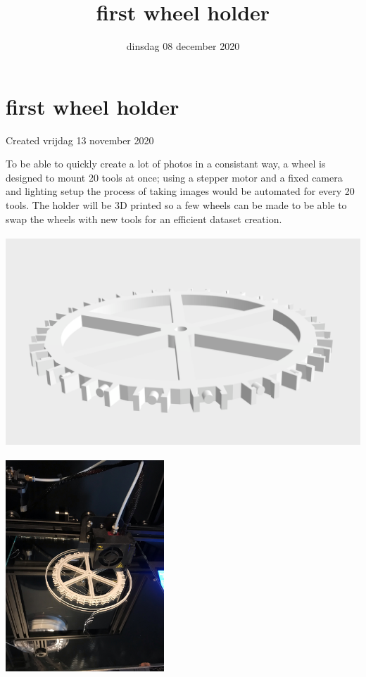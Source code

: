 \documentclass{scrartcl}
\title{first wheel holder}
\date{dinsdag 08 december 2020}
\author{}
\begin{document}
\maketitle

		\section{first wheel holder}

Created vrijdag 13 november 2020



To be able to quickly create a lot of photos in a consistant way, a wheel is designed to mount 20 tools at once; using a stepper motor and a fixed camera and lighting setup the process of taking images would be automated for every 20 tools. The holder will be 3D printed so a few wheels can be made to be able to swap the wheels with new tools for an efficient dataset creation.



\includegraphics[height=3.125000in, keepaspectratio=true]{./first_wheel_holder/radhouder.png}



\includegraphics[height=3.125000in, keepaspectratio=true]{./first_wheel_holder/radhouder_duringprint.jpeg}
\end{document}
